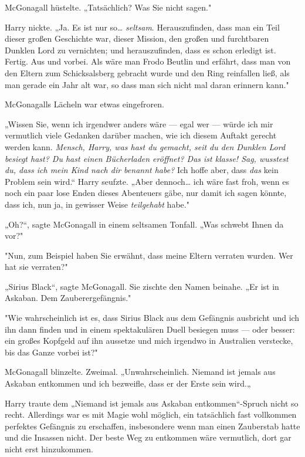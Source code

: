{McGonagall hüstelte. „Tatsächlich? Was Sie nicht sagen."

Harry nickte. „Ja. Es ist nur so… \emph{seltsam}. Herauszufinden, dass man ein Teil dieser großen Geschichte war, dieser Mission, den großen und furchtbaren Dunklen Lord zu vernichten; und herauszufinden, dass es schon erledigt ist. Fertig. Aus und vorbei. Als wäre man Frodo Beutlin und erfährt, dass man von den Eltern zum Schicksalsberg gebracht wurde und den Ring reinfallen ließ, als man gerade ein Jahr alt war, so dass man sich nicht mal daran erinnern kann."

McGonagalls Lächeln war etwas eingefroren.

„Wissen Sie, wenn ich irgendwer anders wäre --- egal wer --- würde ich mir vermutlich viele Gedanken darüber machen, wie ich diesem Auftakt gerecht werden kann. \emph{Mensch, Harry, was hast du gemacht, seit du den Dunklen Lord besiegt hast? Du hast einen Bücherladen eröffnet? Das ist klasse! Sag, wusstest du, dass ich mein Kind nach dir benannt habe?} Ich hoffe aber, dass \emph{das} kein Problem sein wird.“ Harry seufzte. „Aber dennoch… ich wäre fast froh, wenn es noch ein paar lose Enden dieses Abenteuers gäbe, nur damit ich sagen könnte, dass ich, nun ja, in gewisser Weise \emph{teilgehabt} habe."

„Oh?“, sagte McGonagall in einem seltsamen Tonfall. „Was schwebt Ihnen da vor?"

"Nun, zum Beispiel haben Sie erwähnt, dass meine Eltern verraten wurden. Wer hat sie verraten?"

„Sirius Black“, sagte McGonagall. Sie zischte den Namen beinahe. „Er ist in Askaban. Dem Zauberergefängnis."

"Wie wahrscheinlich ist es, dass Sirius Black aus dem Gefängnis ausbricht und ich ihn dann finden und in einem spektakulären Duell besiegen muss --- oder besser: ein großes Kopfgeld auf ihn aussetze und mich irgendwo in Australien verstecke, bis das Ganze vorbei ist?"

McGonagall blinzelte. Zweimal. „Unwahrscheinlich. Niemand ist jemals aus Askaban entkommen und ich bezweifle, dass er der Erste sein wird.„

Harry traute dem „Niemand ist jemals aus Askaban entkommen“-Spruch nicht so recht. Allerdings war es mit Magie wohl möglich, ein tatsächlich fast vollkommen perfektes Gefängnis zu erschaffen, insbesondere wenn man einen Zauberstab hatte und die Insassen nicht. Der beste Weg zu entkommen wäre vermutlich, dort gar nicht erst hinzukommen.

}
